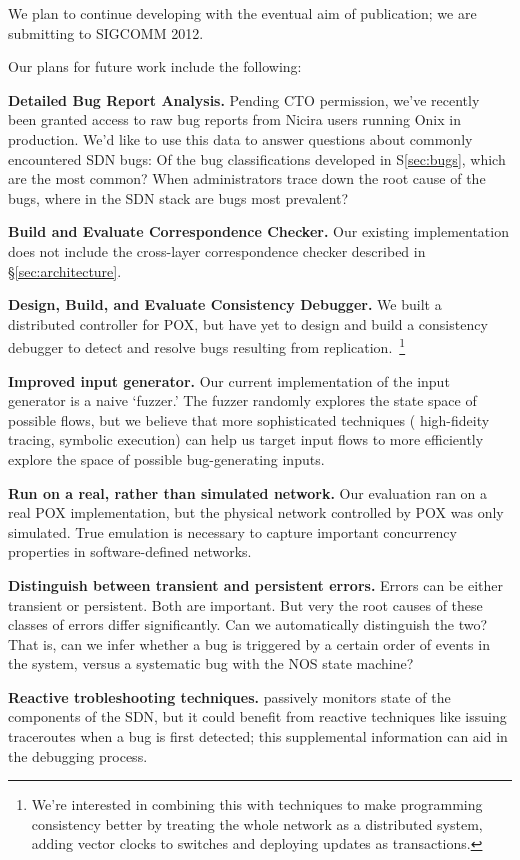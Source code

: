 We plan to continue developing \projectname{} with the eventual aim of
publication; we are submitting to SIGCOMM 2012. 

Our plans for future work include the following:

{\bf Detailed Bug Report Analysis.} Pending CTO permission, we've recently
 been granted access to raw bug reports from Nicira users running Onix in production. 
 We'd like to use this data to answer questions about commonly encountered SDN bugs: 
 Of the bug classifications developed in S\ref{sec:bugs}, which are the most common?    
 When administrators trace down the root cause of the bugs, where in the SDN stack are
 bugs most prevalent?

{\bf Build and Evaluate Correspondence Checker.} Our existing implementation does not
include the cross-layer correspondence checker described in \S\ref{sec:architecture}.

{\bf Design, Build, and Evaluate Consistency Debugger.} We built a distributed controller for
POX, but have yet to design and build a consistency debugger to detect and resolve bugs
resulting from replication.~\footnote{We're interested in combining this with techniques to make
programming consistency better by treating the whole network as a distributed system, \eg{} adding
vector clocks to switches and deploying updates as transactions.}

{\bf Improved input generator.} Our current implementation of the input generator is
a naive `fuzzer.' The fuzzer randomly explores the state space of possible flows, but
we believe that more sophisticated techniques (\eg{} high-fideity tracing, symbolic execution) can help
us target input flows to more efficiently explore the space of possible bug-generating inputs. 

{\bf Run on a real, rather than simulated network.} Our evaluation ran on a real POX implementation,
but the physical network controlled by POX was only simulated. True emulation
is necessary to capture important concurrency properties in software-defined
networks.

{\bf Distinguish between transient and persistent errors.} Errors can be either
transient or persistent. Both are important. But very the root causes of these
classes of errors differ significantly. Can we
automatically distinguish the two? That is, can we infer whether a bug is
triggered by a certain order of events in the system, versus a systematic bug
with the NOS state machine?

{\bf Reactive trobleshooting techniques.} \projectname{} passively monitors state of the 
components of the SDN, but it could benefit from reactive techniques like issuing traceroutes
when a bug is first detected; this supplemental information can aid in the debugging process.

